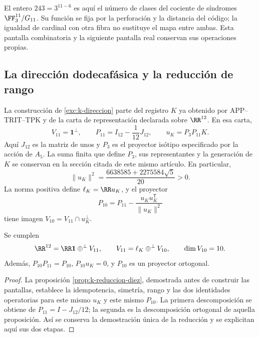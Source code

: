 El entero \(243=3^{11-6}\) es aquí el número de clases
del cociente de síndromes \(\FF_3^{11}/G_{11}\). Su
función se fija por la perforación y la distancia del
código; la igualdad de cardinal con otra fibra no sustituye
el mapa entre ambas. Esta pantalla combinatoria y la
siguiente pantalla real conservan sus operaciones propias.

\subsection{La dirección dodecafásica y la reducción de rango}

La construcción de \ref{exc:k-direccion} parte del registro
\(K\) ya obtenido por APP--TRIT--TPK y de la carta de
representación declarada sobre \(\RR^{12}\). En esa carta,
\begin{equation}
 V_{11}=\mathbf1^\perp,\qquad
 P_{11}=I_{12}-\frac1{12}J_{12},\qquad
 u_K=P_3P_{11}K.
 \label{iv:eq:p11-uk}
\end{equation}
Aquí \(J_{12}\) es la matriz de unos y \(P_3\) es el
proyector isótipo especificado por la acción de \(A_5\).
La suma finita que define \(P_3\), sus representantes y la
generación de \(K\) se conservan en la sección citada de
este mismo artículo. En particular,
\[
 \|u_K\|^2=\frac{6638585+2275584\sqrt5}{20}>0.
\]
La norma positiva define \(\ell_K=\RR u_K\), y el
proyector
\begin{equation}
 P_{10}=P_{11}-\frac{u_Ku_K^{\mathsf T}}{\|u_K\|^2}
 \label{iv:eq:p10}
\end{equation}
tiene imagen \(V_{10}=V_{11}\cap u_K^\perp\).

\begin{proposition}
\label{iv:prop:12-11-10}
Se cumplen
\[
 \RR^{12}=\RR\mathbf1\mathbin{\oplus^\perp}V_{11},\qquad
 V_{11}=\ell_K\mathbin{\oplus^\perp}V_{10},\qquad
 \dim V_{10}=10.
\]
Además, \(P_{10}P_{11}=P_{10}\), \(P_{10}u_K=0\), y
\(P_{10}\) es un proyector ortogonal.
\end{proposition}
\begin{proof}
La proposición \ref{prop:k-reduccion-diez}, demostrada antes de
construir las pantallas, establece la idempotencia, simetría, rango y
las dos identidades operatorias para este mismo \(u_K\) y este mismo
\(P_{10}\). La primera descomposición se obtiene de
\(P_{11}=I-J_{12}/12\); la segunda es la descomposición ortogonal
de aquella proposición. Así se conserva la demostración única de la
reducción y se explicitan aquí sus dos etapas.
\end{proof}

